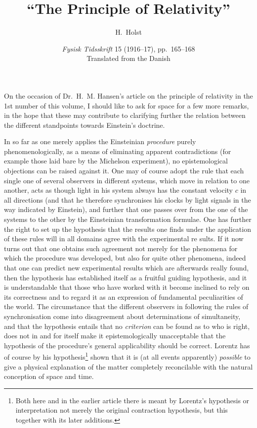 \documentclass[12pt,a4paper]{article}
\title{\textbf{``The Principle of Relativity''}}
\author{H.\ Holst}
\date{\textit{Fysisk Tidsskrift} 15 (1916--17), pp.~165--168\\[2pt]
\small Translated from the Danish}
\begin{document}
\maketitle

On the occasion of Dr.~H.~M. Hansen's article on the principle of relativity
in the 1st number of this volume, I should like to ask for space for a few
more remarks, in the hope that these may contribute to clarifying further the
relation between the different standpoints towards Einstein's doctrine.

In so far as one merely applies the Einsteinian \emph{procedure} purely
phenomenologically, as a means of eliminating apparent contradictions (for
example those laid bare by the Michelson experiment), no epistemological
objections can be raised against it. One may of course adopt the rule that
each single one of several observers in different systems, which move in
relation to one another, acts as though light in his system always has the
constant velocity $c$ in all directions (and that he therefore synchronises
his clocks by light signals in the way indicated by Einstein), and further
that one passes over from the one of the systems to the other by the
Einsteinian transformation formulae. One has further the right to set up the
hypothesis that the results one finds under the application of these rules
will in all domains agree with the experimental re\-%
sults. If it now turns out that one obtains such agreement not merely for the
phenomena for which the procedure was developed, but also for quite other
phenomena, indeed that one can predict new experimental results which are
afterwards really found, then the hypothesis has established itself as a
fruitful guiding hypothesis, and it is understandable that those who have
worked with it become inclined to rely on its correctness and to regard it as
an expression of fundamental peculiarities of the world. The circumstance that
the different observers in following the rules of synchronisation come into
disagreement about determinations of simultaneity, and that the hypothesis
entails that no \emph{criterion} can be found as to who is right, does not in
and for itself make it epistemologically unacceptable that the hypothesis of
the procedure's general applicability should be correct. Lorentz has of course
by his hypothesis\footnote{Both here and in the earlier article there is meant
by Lorentz's hypothesis or interpretation not merely the original contraction
hypothesis, but this together with its later additions.} shown that it is (at
all events apparently) \emph{possible} to give a physical explanation of the
matter completely reconcilable with the natural conception of space and time.
\end{document}
